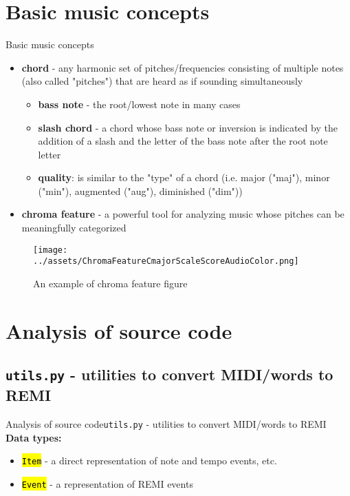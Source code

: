\documentclass{beamer}
\newcommand{\thiss}{}
\newcommand{\thisss}{}
\newcommand{\code}[1]{\textcolor{ReddishOrange}{\hl{\texttt{#1}}}}
\begin{document}
\renewcommand{\thiss}{Basic music concepts}
\section{\thiss}
\begin{frame}[allowframebreaks]{\thiss}
    \begin{itemize}
        \item \textbf{chord} - any harmonic set of pitches/frequencies consisting of multiple notes (also called "pitches") that are heard as if sounding simultaneously \cite{chordwiki}
            \begin{itemize}
                \item \textbf{bass note} - the root/lowest note in many cases \cite{bassnotewiki}
                \item \textbf{slash chord} - a chord whose bass note or inversion is indicated by the addition of a slash and the letter of the bass note after the root note letter \cite{slashchordwiki}
                \item \textbf{quality}: is similar to the "type" of a chord (i.e. major ("maj"), minor ("min"), augmented ("aug"), diminished ("dim"))
            \end{itemize}

        \framebreak

        \item \textbf{chroma feature} - a powerful tool for analyzing music whose pitches can be meaningfully categorized \cite{chromawiki}
    \end{itemize}

    \begin{center}
        \begin{figure}
            \texttt{[image: ../assets/ChromaFeatureCmajorScaleScoreAudioColor.png]}
            \caption{An example of chroma feature figure \cite{chromawiki}}
        \end{figure}
    \end{center}

    \framebreak
\end{frame}

\renewcommand{\thiss}{Analysis of source code}
\renewcommand{\thisss}{\texttt{utils.py} - utilities to convert MIDI/words to REMI}
\section{\thiss}
\subsection{\thisss}
\begin{frame}{\thiss}{\thisss}
    \textbf{Data types:}
    \begin{itemize}
        \item \code{Item} - a direct representation of note and tempo events, etc.
        \item \code{Event} - a representation of REMI events
    \end{itemize}
\end{frame}
\end{document}
